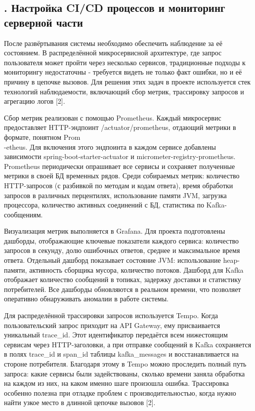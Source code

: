 \subtitlespace

\subsection*{
\gostTitleFont
\redline
\thechaptercntr .\thesubchaptercntr \spc
Настройка CI/CD процессов и мониторинг серверной части
} \addtocounter{subchaptercntr}{1}

\subtitlespace

{\gostFont

\par \redline После развёртывания системы необходимо обеспечить наблюдение за её состоянием. В распределённой микросервисной архитектуре, где запрос пользователя может пройти через несколько сервисов, традиционные подходы к мониторингу недостаточны - требуется видеть не только факт ошибки, но и её причину в цепочке вызовов. Для решения этих задач в проекте используется стек технологий наблюдаемости, включающий сбор метрик, трассировку запросов и агрегацию логов [2].

\par \redline Сбор метрик реализован с помощью Prometheus. Каждый микросервис предоставляет HTTP-эндпоинт /actuator/prometheus, отдающий метрики в формате, понятном Prom\\-etheus. Для включения этого эндпоинта в каждом сервисе добавлены зависимости spring-boot-starter-actuator и micrometer-registry-prometheus. Prometheus периодически опрашивает все сервисы и сохраняет полученные метрики в своей БД временных рядов. Среди собираемых метрик: количество HTTP-запросов (с разбивкой по методам и кодам ответа), время обработки запросов в различных перцентилях, использование памяти JVM, загрузка процессора, количество активных соединений с БД, статистика по Kafka-сообщениям.

\par \redline Визуализация метрик выполняется в Grafana. Для проекта подготовлены дашборды, отображающие ключевые показатели каждого сервиса: количество запросов в секунду, долю ошибочных ответов, среднее и максимальное время ответа. Отдельный дашборд показывает состояние JVM: использование heap-памяти, активность сборщика мусора, количество потоков. Дашборд для Kafka отображает количество сообщений в топиках, задержку доставки и статистику потребителей. Все дашборды обновляются в реальном времени, что позволяет оперативно обнаруживать аномалии в работе системы.

\par \redline Для распределённой трассировки запросов используется Tempo. Когда пользовательский запрос приходит на API Gateway, ему присваивается уникальный trace\_id. Этот идентификатор передаётся всем нижестоящим сервисам через HTTP-заголовки, а при отправке сообщений в Kafka сохраняется в полях trace\_id и span\_id таблицы kafka\_messages и восстанавливается на стороне потребителя. Благодаря этому в Tempo можно проследить полный путь запроса: какие сервисы были задействованы, сколько времени заняла обработка на каждом из них, на каком именно шаге произошла ошибка. Трассировка особенно полезна при отладке проблем с производительностью, когда нужно найти узкое место в длинной цепочке вызовов [2].

}
